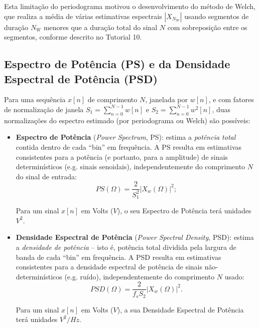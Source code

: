\documentclass[a4paper,twoside,12pt]{article}
\begin{document}
	Esta limitação do periodograma motivou o desenvolvimento do método de Welch, que realiza a média de várias estimativas espectrais $|X_{N_{W}}|$ usando segmentos de duração $N_{W}$ menores que a duração total do sinal $N$ com sobreposição entre os segmentos, conforme descrito no Tutorial 10.
	
	\subsection{Espectro de Potência (PS) e da Densidade Espectral de Potência (PSD)}
	
	Para uma sequência $x[n]$ de comprimento $N$, janelada por $w[n]$, e com fatores de normalização de janela $S_1 = \sum_{n=0}^{N-1} w[n]$ e $S_2 = \sum_{n=0}^{N-1} w^2[n]$, duas normalizações do espectro estimado (por periodograma ou Welch) são possíveis:
	
	\begin{itemize}
		\item \textbf{Espectro de Potência} (\emph{Power Spectrum}, PS): estima a \emph{potência total} contida dentro de cada ``bin'' em frequência. A PS resulta em estimativas consistentes para a potência (e portanto, para a amplitude) de sinais determinísticos (e.g. sinais senoidais), independentemente do comprimento $N$ do sinal de entrada:
		\begin{equation}
			PS(\Omega) = \frac{2}{S_1^2} \left| X_w(\Omega) \right|^2;
		\end{equation}
		
		Para um sinal $x[n]$ em Volts ($V$), o seu Espectro de Potência terá unidades $V^2$.
		
		\item \textbf{Densidade Espectral de Potência} (\emph{Power Spectral Density}, PSD): estima a \emph{densidade de potência} -- isto é, potência total dividida pela largura de banda de cada ``bin'' em frequência. A PSD resulta em estimativas consistentes para a densidade espectral de potência de sinais não-determinísticos (e.g. ruído), independentemente do comprimento $N$ usado:
		\begin{equation}
			PSD(\Omega) = \frac{2}{f_s S_2} \left| X_w(\Omega) \right|^2.
		\end{equation}
		
		Para um sinal $x[n]$ em Volts ($V$), a sua Densidade Espectral de Potência terá unidades $V^2 / Hz$.
		
	\end{itemize}
	
\end{document}
